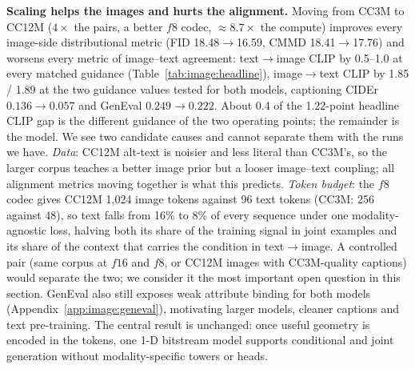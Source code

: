 \textbf{Scaling helps the images and hurts the alignment.} Moving from CC3M to CC12M ($4\times$
the pairs, a better $f8$ codec, $\approx8.7\times$ the compute) improves every image-side
distributional metric (FID 18.48$\rightarrow$16.59, CMMD 18.41$\rightarrow$17.76) and worsens every
metric of image--text agreement: text$\rightarrow$image CLIP by 0.5--1.0 at every matched guidance
(Table~\ref{tab:image:headline}), image$\rightarrow$text CLIP by 1.85 / 1.89 at the two guidance
values tested for both models, captioning CIDEr $0.136\rightarrow0.057$ and GenEval
$0.249\rightarrow0.222$. About 0.4 of the 1.22-point headline CLIP gap is the different guidance of
the two operating points; the remainder is the model. We see two candidate causes and cannot
separate them with the runs we have. \emph{Data}: CC12M alt-text is noisier and less literal than
CC3M's, so the larger corpus teaches a better image prior but a looser image--text coupling; all
alignment metrics moving together is what this predicts. \emph{Token budget}: the $f8$ codec gives
CC12M 1{,}024 image tokens against 96 text tokens (CC3M: 256 against 48), so text falls from 16\%
to 8\% of every sequence under one modality-agnostic loss, halving both its share of the training
signal in joint examples and its share of the context that carries the condition in
text$\rightarrow$image. A controlled pair (same corpus at $f16$ and $f8$, or CC12M images with
CC3M-quality captions) would separate the two; we consider it the most important open question in
this section. GenEval
also still exposes weak attribute binding for both models (Appendix~\ref{app:image:geneval}),
motivating larger models, cleaner captions and text pre-training. The central result is unchanged:
once useful geometry is encoded in the tokens, one 1-D bitstream model supports conditional and
joint generation without modality-specific towers or heads.

\FloatBarrier
